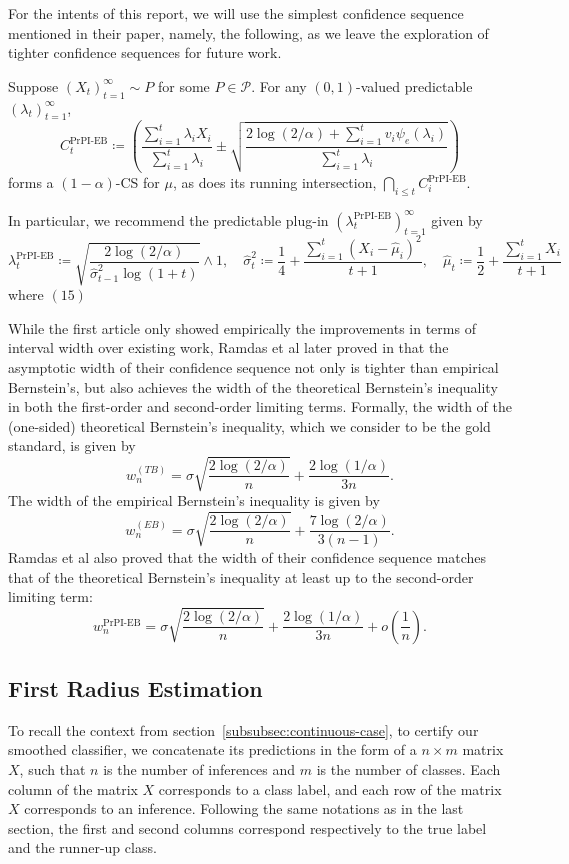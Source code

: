 For the intents of this report, we will use the simplest confidence sequence mentioned in their paper, namely, the following, as we leave the exploration of tighter confidence sequences for future work.
\begin{proposition}
    Suppose $(X_t)_{t=1}^\infty \sim P$ for some $P \in \mathcal{P}$. For any $(0,1)$-valued predictable $(\lambda_t)_{t=1}^\infty$,
    \[
        C_t^{\text{PrPI-EB}} \coloneqq \left( \frac{\sum_{i=1}^t \lambda_i X_i}{\sum_{i=1}^t \lambda_i}\pm \sqrt{\frac{2\log(2/\alpha) + \sum_{i=1}^t v_i \psi_e (\lambda_i)}{\sum_{i=1}^t \lambda_i}} \right)
    \]
    forms a $(1-\alpha)$-CS for $\mu$, as does its running intersection, $\bigcap_{i \leq t} C_i^{\text{PrPI-EB}}$.

    In particular, we recommend the predictable plug-in $(\lambda_t^{\text{PrPI-EB}})_{t=1}^\infty$ given by
    \[
        \lambda_t^{\text{PrPI-EB}} \coloneqq \sqrt{\frac{2\log(2/\alpha)}{\hat{\sigma}_{t-1}^2 \log(1 + t)}} \wedge 1, \quad \hat{\sigma}_t^2 \coloneqq \frac{1}{4} + \frac{\sum_{i=1}^t (X_i - \hat{\mu}_i)^2}{t + 1}, \quad \hat{\mu}_t \coloneqq \frac{1}{2} + \frac{\sum_{i=1}^t X_i}{t + 1}
    \]
    where $(15)$
\end{proposition}

While the first article only showed empirically the improvements in terms of interval width over existing work, Ramdas et al later proved in that the asymptotic width of their confidence sequence not only is tighter than empirical Bernstein's, but also achieves the width of the theoretical Bernstein's inequality in both the first-order and second-order limiting terms.
Formally, the width of the (one-sided) theoretical Bernstein's inequality, which we consider to be the gold standard, is given by
\[
    w_n^{(TB)} = \sigma \sqrt{\frac{2\log(2/\alpha)}{n}} + \frac{2\log(1/\alpha)}{3n}.
\]
The width of the empirical Bernstein's inequality is given by
\[
    w_n^{(EB)} = \sigma \sqrt{\frac{2\log(2/\alpha)}{n}} + \frac{7\log(2/\alpha)}{3(n-1)}.
\]
Ramdas et al also proved that the width of their confidence sequence matches that of the theoretical Bernstein's inequality at least up to the second-order limiting term:
\[
    w_n^{\text{PrPI-EB}} = \sigma \sqrt{\frac{2\log(2/\alpha)}{n}} + \frac{2\log(1/\alpha)}{3n}+{o}\left( \frac{1}{n} \right).
\]

\subsection{First Radius Estimation}\label{subsec:first-radius-estimation-continuous}
To recall the context from section~\ref{subsubsec:continuous-case}, to certify our smoothed classifier, we concatenate its predictions in the form of a $n \times m$ matrix $X$, such that $n$ is the number of inferences and $m$ is the number of classes.
Each column of the matrix $X$ corresponds to a class label, and each row of the matrix $X$ corresponds to an inference.
Following the same notations as in the last section, the first and second columns correspond respectively to the true label and the runner-up class.

